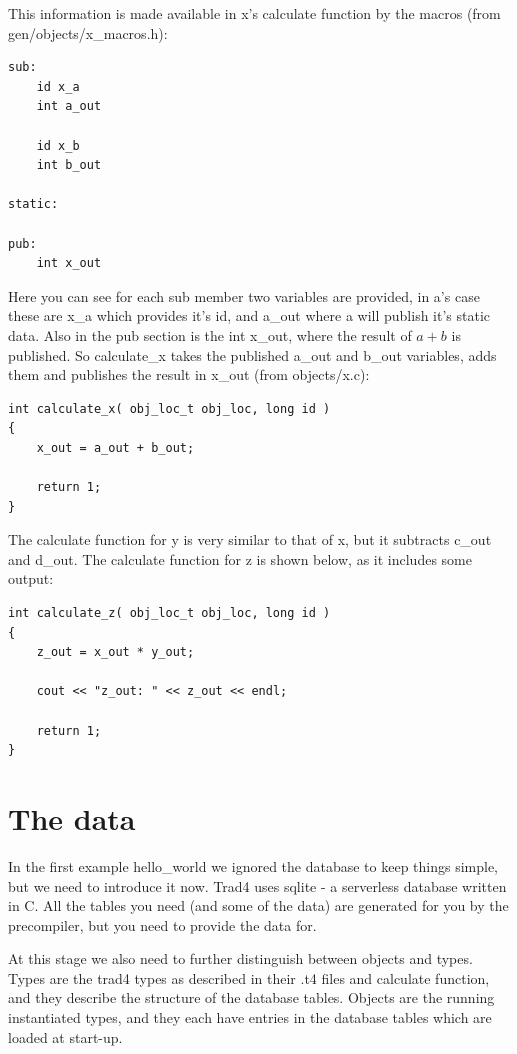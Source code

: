 \documentclass{report}
\begin{document}
This information is made available in x's calculate function by the macros (from gen/objects/x_macros.h):

\begin{verbatim}
sub:
    id x_a
    int a_out

    id x_b
    int b_out

static:

pub:
    int x_out
\end{verbatim}

Here you can see for each sub member two variables are provided, in a's case these are x_a which provides it's id, and a_out where a will publish it's static data. Also in the pub section is the int x_out, where the result of  \(a + b\) is published. So calculate_x takes the published a_out and b_out variables, adds them and publishes the result in x_out (from objects/x.c):

\begin{verbatim}
int calculate_x( obj_loc_t obj_loc, long id )
{
    x_out = a_out + b_out;

    return 1;
}
\end{verbatim}

The calculate function for y is very similar to that of x, but it subtracts c_out and d_out. The calculate function for z is shown below, as it includes some output:

\begin{verbatim}
int calculate_z( obj_loc_t obj_loc, long id )
{
    z_out = x_out * y_out;

    cout << "z_out: " << z_out << endl;

    return 1;
}
\end{verbatim}

\section{The data}
\label{sec:The data}

In the first example hello_world we ignored the database to keep things simple, but we need to introduce it now. Trad4 uses sqlite - a serverless database written in C. All the tables you need (and some of the data) are generated for you by the precompiler, but you need to provide the data for.

At this stage we also need to further distinguish between objects and types. Types are the trad4 types as described in their .t4 files and calculate function, and they describe the structure of the database tables. Objects are the running instantiated types, and they each have entries in the database tables which are loaded at start-up.
\end{document}
